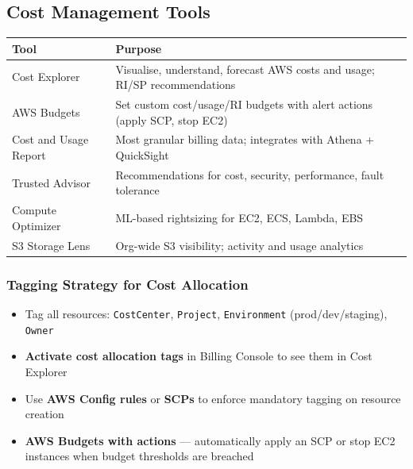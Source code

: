 \subsection{Cost Management Tools}

\begin{comparebox}[title={Cost management tool comparison}]
\begin{tabular}{@{}p{3.8cm}p{7.5cm}@{}}
\toprule
\textbf{Tool} & \textbf{Purpose} \\
\midrule
Cost Explorer            & Visualise, understand, forecast AWS costs and usage; RI/SP recommendations \\
AWS Budgets              & Set custom cost/usage/RI budgets with alert actions (apply SCP, stop EC2) \\
Cost and Usage Report    & Most granular billing data; integrates with Athena + QuickSight \\
Trusted Advisor          & Recommendations for cost, security, performance, fault tolerance \\
Compute Optimizer        & ML-based rightsizing for EC2, ECS, Lambda, EBS \\
S3 Storage Lens          & Org-wide S3 visibility; activity and usage analytics \\
\bottomrule
\end{tabular}
\end{comparebox}

\subsubsection{Tagging Strategy for Cost Allocation}
\begin{itemize}
  \item Tag all resources: \texttt{CostCenter}, \texttt{Project}, \texttt{Environment} (prod/dev/staging), \texttt{Owner}
  \item \textbf{Activate cost allocation tags} in Billing Console to see them in Cost Explorer
  \item Use \textbf{AWS Config rules} or \textbf{SCPs} to enforce mandatory tagging on resource creation
  \item \textbf{AWS Budgets with actions} --- automatically apply an SCP or stop EC2 instances when budget thresholds are breached
\end{itemize}
